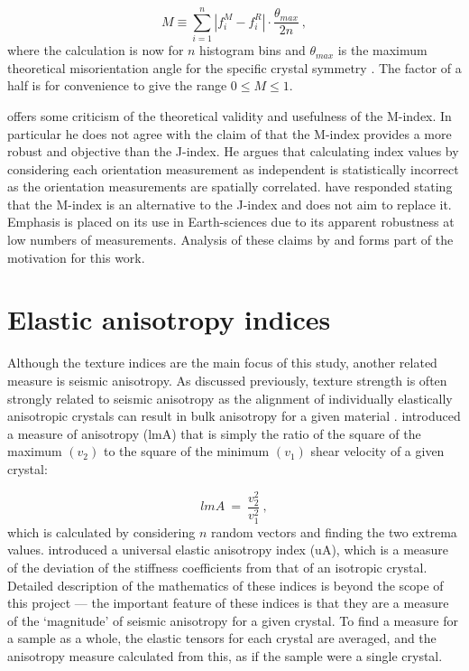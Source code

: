 \documentclass[a4paper,12pt,twoside]{report}
\numberwithin{equation}{chapter}
\begin{document}
\begin{equation} \label{eq:Mindex_disc}
M \equiv \sum_{i=1}^n | f_i^M - f_i^R | \cdot \frac{\theta_{max}}{2n}\ ,
\end{equation} 
where the calculation is now for $n$ histogram bins and $\theta_{max}$ is the maximum theoretical misorientation angle for the specific crystal symmetry \citep[for discussion on misorientation angle distirbutions for various crystal symmetries see][and references therein]{Grimmer1979,Wheeler2001}. The factor of a half is for convenience to give the range $0 \leq M \leq 1$. 

  

\cite{Schaeben2007} offers some criticism of the theoretical validity and usefulness of the M-index. In particular he does not agree with the claim of \cite{Skemer} that the M-index provides a more robust and objective than the J-index. He argues that calculating index values by considering each orientation measurement as independent is statistically incorrect as the orientation measurements are spatially correlated. \cite{Skemer2007reply} have responded stating that the M-index is an alternative to the J-index and does not aim to replace it. Emphasis is placed on its use in Earth-sciences due to its apparent robustness at low numbers of measurements. Analysis of these claims by \cite{Skemer} and \cite{Skemer2007reply} forms part of the motivation for this work.  

\section{Elastic anisotropy indices} \label{sec:anisotropy_indices}

Although the texture indices are the main focus of this study, another related measure is seismic anisotropy. As discussed previously, texture strength is often strongly related to seismic anisotropy as the alignment of individually elastically anisotropic crystals can result in bulk anisotropy for a given material \citep[e.g.][]{Tommasi1999,Miyagi2010}. \cite{Ledbetter2006} introduced a measure of anisotropy (lmA) that is simply the ratio of the square of the maximum $(v_2)$ to the square of the minimum $(v_1)$ shear velocity of a given crystal:

\begin{equation}
lmA\ =\ \frac{v_2^2}{v_1^2}\ ,
\end{equation}   
\noindent
which is calculated by considering $n$ random vectors and finding the two extrema values. \cite{Ranganathan2008} introduced a universal elastic anisotropy index (uA), which is a measure of the deviation of the stiffness coefficients from that of an isotropic crystal. Detailed description of the mathematics of these indices is beyond the scope of this project \citep[for full descriptions see][]{Ledbetter2006,Ranganathan2008} --- the important feature of these indices is that they are a measure of the \lq{}magnitude\rq{} of seismic anisotropy for a given crystal. To find a measure for a sample as a whole, the elastic tensors for each crystal are averaged, and the anisotropy measure calculated from this, as if the sample were a single crystal. 
\end{document}
